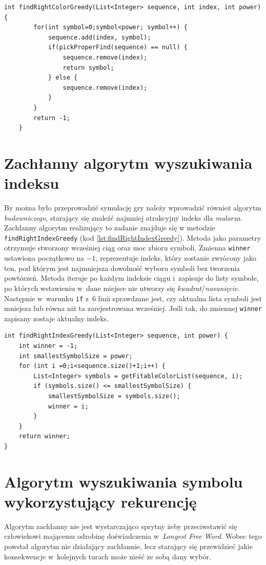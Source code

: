 \documentclass[document]{xmgr}
\begin{document}
\begin{lstlisting}[caption={Metoda zachłannie szukająca symbolu.},label=lst:findRightColorGreedy]
int findRightColorGreedy(List<Integer> sequence, int index, int power) {
		for(int symbol=0;symbol<power; symbol++) {
			sequence.add(index, symbol);
			if(pickProperFind(sequence) == null) {
				sequence.remove(index);
				return symbol;
			} else {
				sequence.remove(index);
			}
		}
		return -1;
	}
\end{lstlisting}
\newpage
\section{Zachłanny algorytm wyszukiwania indeksu}
By można było przeprowadzić symulację gry należy wprowadzić również algorytm \emph{budowniczego}, starający się znaleźć najmniej atrakcyjny indeks dla \emph{malarza}. Zachłanny algorytm realizujący to zadanie znajduje się w metodzie \texttt{findRightIndexGreedy} (kod \ref{lst:findRightIndexGreedy}). Metoda jako parametry otrzymuje stworzony wcześniej ciąg oraz moc zbioru symboli. Zmienna \texttt{winner} ustawiona początkowo na $-1$, reprezentuje indeks, który zostanie zwrócony jako ten, pod którym jest najmniejsza dowolność wyboru symboli bez tworzenia powtórzeń. Metoda iteruje po każdym indeksie ciągu i~zapisuje do listy symbole, po których wstawieniu w~dane miejsce nie utworzy się \emph{kwadrat}/\emph{nasunięcie}. Następnie w~warunku \texttt{if} z~6 linii sprawdzane jest, czy aktualna lista symboli jest mniejsza lub równa niż ta zarejestrowana wcześniej. Jeśli tak, do zmiennej \texttt{winner} zapisany zostaje aktualny indeks.

\begin{lstlisting}[caption={Metoda zachłannie szukająca indeksu.},label=lst:findRightIndexGreedy]
int findRightIndexGreedy(List<Integer> sequence, int power) {
	int winner = -1;
	int smallestSymbolSize = power;
	for (int i =0;i<sequence.size()+1;i++) {
		List<Integer> symbols = getFitableColorList(sequence, i);
		if (symbols.size() <= smallestSymbolSize) {
			smallestSymbolSize = symbols.size();
			winner = i;
		}
	}
	return winner;
}
\end{lstlisting}

\section{Algorytm wyszukiwania symbolu wykorzystujący rekurencję}
Algorytm zachłanny nie jest wystarczająco sprytny żeby przeciwstawić się człowiekowi mającemu odrobinę doświadczenia w~\emph{Longest Free Word}. Wobec tego powstał algorytm nie działający zachłannie, lecz starający się przewidzieć jakie konsekwencje w~kolejnych turach może nieść ze sobą dany wybór.
\end{document}
